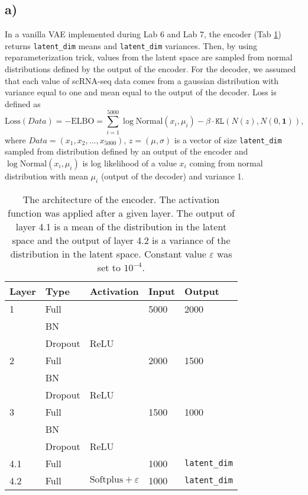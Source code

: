 \documentclass[a4paper,11pt]{article}
\begin{document}
\subsection*{a)}
In a vanilla VAE implemented during Lab 6 and Lab 7, the encoder (Tab \ref{encoder1}) returns \texttt{latent\_dim} means and \texttt{latent\_dim} variances. Then, by using reparameterization trick, values from the latent space are sampled from normal distributions defined by the output of the encoder.
For the decoder, we assumed that each value of scRNA-seq data comes from a gaussian distribution with variance equal to one and mean equal to the output of the decoder. Loss is defined as
\begin{equation}
    \text{Loss}(Data) = -\text{ELBO} = \sum_{i = 1}^{5000} \log{\text{Normal}(x_i, \mu_i)}-\beta \cdot \texttt{KL}(N(z), N(0, \mathbf{1})),
\end{equation}
where $Data = (x_1, x_2, ..., x_{5000})$, $z = (\mu, \sigma)$ is a vector of size \texttt{latent\_dim} sampled from distribution defined by an output of the encoder and $\log{\text{Normal}(x_i, \mu_i)}$ is log likelihood of a value $x_i$ coming from normal distribution with mean $\mu_i$ (output of the decoder) and variance 1.
\begin{table}[H]
\centering
\begin{tabular}{|l l l l l|}
\hline
 \textbf{Layer} & \textbf{Type} &  \textbf{Activation} &  \textbf{Input} &  \textbf{Output} \\ \hline
 1 & Full &   &  5000 &  2000 \\ \
  & BN &   &   &    \\ \
  & Dropout &  ReLU &   &    \\ \hline
 2 & Full &   &  2000 &  1500 \\ \
  & BN &   &   &   \\ \
  & Dropout &  ReLU &   &    \\ \hline
 3 & Full &   &  1500 &  1000 \\ \
  & BN &   &   &   \\ \
  & Dropout &  ReLU &   &    \\ \hline
 4.1 & Full &   &  1000 &  \texttt{latent\_dim}\\ \hline
 4.2 & Full &  $\text{Softplus} + \varepsilon$ &  1000 &  \texttt{latent\_dim} \\ \hline
\end{tabular}
\label{encoder1}
\caption{The architecture of the encoder. The activation function was applied after a given layer. The output of layer 4.1 is a mean of the distribution in the latent space and the output of layer 4.2 is a variance of the distribution in the latent space. Constant value $\varepsilon$ was set to $10^{-4}$.}
\end{table}
\end{document}
